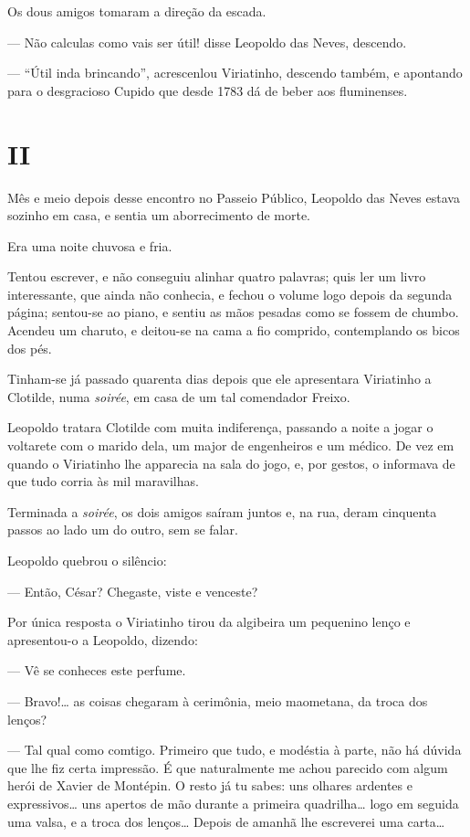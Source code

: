 Os dous amigos tomaram a direção da escada.

--- Não calculas como vais ser útil! disse Leopoldo das Neves, descendo.

--- ``Útil inda brincando'', acrescenlou Viriatinho, descendo também, e
apontando para o desgracioso Cupido que desde 1783 dá de beber aos
fluminenses.

\section{II}

Mês e meio depois desse encontro no Passeio Público, Leopoldo das Neves
estava sozinho em casa, e sentia um aborrecimento de morte.

Era uma noite chuvosa e fria.

Tentou escrever, e não conseguiu alinhar quatro palavras; quis ler um
livro interessante, que ainda não conhecia, e fechou o volume logo
depois da segunda página; sentou-se ao piano, e sentiu as mãos pesadas
como se fossem de chumbo. Acendeu um charuto, e deitou-se na cama a fio
comprido, contemplando os bicos dos pés.

Tinham-se já passado quarenta dias depois que ele apresentara Viriatinho
a Clotilde, numa \emph{soirée}, em casa de um tal comendador Freixo.

Leopoldo tratara Clotilde com muita indiferença, passando a noite a
jogar o voltarete com o marido dela, um major de engenheiros e um
médico. De vez em quando o Viriatinho lhe apparecia na sala do jogo, e,
por gestos, o informava de que tudo corria às mil maravilhas.

Terminada a \emph{soirée}, os dois amigos saíram juntos e, na rua, deram
cinquenta passos ao lado um do outro, sem se falar.

Leopoldo quebrou o silêncio:

--- Então, César? Chegaste, viste e venceste?

Por única resposta o Viriatinho tirou da algibeira um pequenino lenço e
apresentou-o a Leopoldo, dizendo:

--- Vê se conheces este perfume.

--- Bravo!\ldots{} as coisas chegaram à cerimônia, meio maometana, da troca
dos lenços?

--- Tal qual como comtigo. Primeiro que tudo, e modéstia à parte, não há
dúvida que lhe fiz certa impressão. É que naturalmente me achou parecido
com algum herói de Xavier de Montépin. O resto já tu sabes: uns olhares
ardentes e expressivos\ldots{} uns apertos de mão durante a primeira
quadrilha\ldots{} logo em seguida uma valsa, e a troca dos lenços\ldots{} Depois
de amanhã lhe escreverei uma carta\ldots{}

